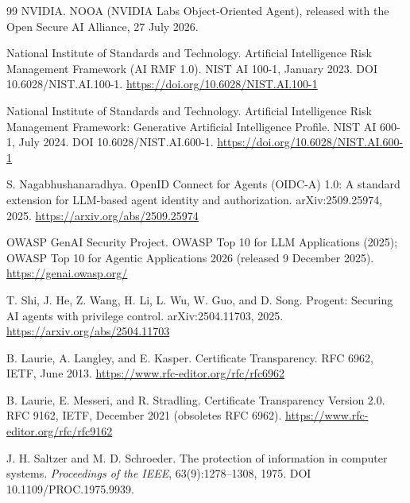 \documentclass[11pt,letterpaper]{article}
\begin{document}
\begin{thebibliography}{99}
NVIDIA.
\newblock NOOA (NVIDIA Labs Object-Oriented Agent), released with the Open Secure AI Alliance, 27 July 2026.

National Institute of Standards and Technology.
\newblock Artificial Intelligence Risk Management Framework (AI RMF 1.0).
\newblock NIST AI 100-1, January 2023. DOI 10.6028/NIST.AI.100-1.
\newblock \url{https://doi.org/10.6028/NIST.AI.100-1}

National Institute of Standards and Technology.
\newblock Artificial Intelligence Risk Management Framework: Generative Artificial Intelligence Profile.
\newblock NIST AI 600-1, July 2024. DOI 10.6028/NIST.AI.600-1.
\newblock \url{https://doi.org/10.6028/NIST.AI.600-1}

S. Nagabhushanaradhya.
\newblock OpenID Connect for Agents (OIDC-A) 1.0: A standard extension for LLM-based agent identity and authorization.
\newblock arXiv:2509.25974, 2025. \url{https://arxiv.org/abs/2509.25974}

OWASP GenAI Security Project.
\newblock OWASP Top 10 for LLM Applications (2025); OWASP Top 10 for Agentic Applications 2026 (released 9 December 2025).
\newblock \url{https://genai.owasp.org/}

T. Shi, J. He, Z. Wang, H. Li, L. Wu, W. Guo, and D. Song.
\newblock Progent: Securing AI agents with privilege control.
\newblock arXiv:2504.11703, 2025. \url{https://arxiv.org/abs/2504.11703}
\newblock [Preprint.]

B. Laurie, A. Langley, and E. Kasper.
\newblock Certificate Transparency.
\newblock RFC 6962, IETF, June 2013. \url{https://www.rfc-editor.org/rfc/rfc6962}

B. Laurie, E. Messeri, and R. Stradling.
\newblock Certificate Transparency Version 2.0.
\newblock RFC 9162, IETF, December 2021 (obsoletes RFC 6962). \url{https://www.rfc-editor.org/rfc/rfc9162}

J. H. Saltzer and M. D. Schroeder.
\newblock The protection of information in computer systems.
\newblock \emph{Proceedings of the IEEE}, 63(9):1278--1308, 1975. DOI 10.1109/PROC.1975.9939.


\end{thebibliography}
\end{document}
